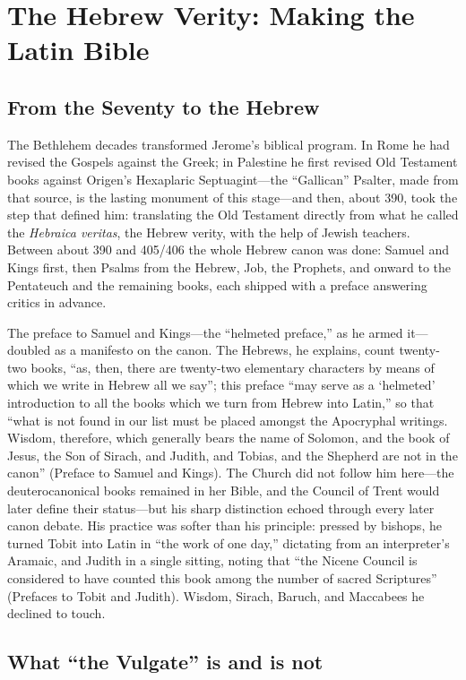 \section{The Hebrew Verity: Making the Latin Bible}

\subsection{From the Seventy to the Hebrew}

The Bethlehem decades transformed Jerome's biblical program. In Rome he had
revised the Gospels against the Greek; in Palestine he first revised Old
Testament books against Origen's Hexaplaric Septuagint---the ``Gallican''
Psalter, made from that source, is the lasting monument of this stage---and
then, about 390, took the step that defined him: translating the Old
Testament directly from what he called the \textit{Hebraica veritas}, the
Hebrew verity, with the help of Jewish teachers. Between about 390 and 405/406
the whole Hebrew canon was done: Samuel and Kings first, then Psalms from the
Hebrew, Job, the Prophets, and onward to the Pentateuch and the remaining
books, each shipped with a preface answering critics in advance.

The preface to Samuel and Kings---the ``helmeted preface,'' as he armed
it---doubled as a manifesto on the canon. The Hebrews, he explains, count
twenty-two books, ``as, then, there are twenty-two elementary characters by
means of which we write in Hebrew all we say''; this preface ``may serve as a
`helmeted' introduction to all the books which we turn from Hebrew into
Latin,'' so that ``what is not found in our list must be placed amongst the
Apocryphal writings. Wisdom, therefore, which generally bears the name of
Solomon, and the book of Jesus, the Son of Sirach, and Judith, and Tobias,
and the Shepherd are not in the canon'' (Preface to Samuel and Kings). The
Church did not follow him here---the deuterocanonical books remained in her
Bible, and the Council of Trent would later define their status---but his
sharp distinction echoed through every later canon debate. His practice was
softer than his principle: pressed by bishops, he turned Tobit into Latin in
``the work of one day,'' dictating from an interpreter's Aramaic, and Judith
in a single sitting, noting that ``the Nicene Council is considered to have
counted this book among the number of sacred Scriptures'' (Prefaces to Tobit
and Judith). Wisdom, Sirach, Baruch, and Maccabees he declined to touch.

\subsection{What ``the Vulgate'' is and is not}

